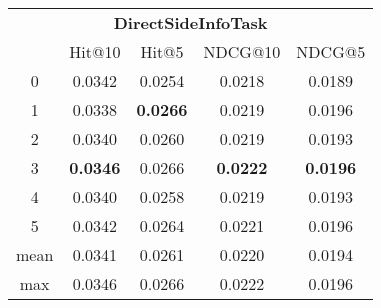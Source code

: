 \documentclass{article}
\begin{document}
 

\begin{tabular}{c|cccc}

\multicolumn{5}{c}{\textbf{DirectSideInfoTask}} \\
\noalign{\smallskip}
\noalign{\smallskip}
\toprule
\multicolumn{1}{c}{Template ID} & \multicolumn{1}{|c}{Hit@10} & \multicolumn{1}{c}{Hit@5} & \multicolumn{1}{c}{NDCG@10} & \multicolumn{1}{c}{NDCG@5} \\
\midrule
0 & 0.0342 & 0.0254 & 0.0218 & 0.0189 \\
1 & 0.0338 & \textbf{0.0266} & 0.0219 & 0.0196 \\
2 & 0.0340 & 0.0260 & 0.0219 & 0.0193 \\
3 & \textbf{0.0346} & 0.0266 & \textbf{0.0222} & \textbf{0.0196} \\
4 & 0.0340 & 0.0258 & 0.0219 & 0.0193 \\
5 & 0.0342 & 0.0264 & 0.0221 & 0.0196 \\
\midrule
mean & 0.0341 & 0.0261 & 0.0220 & 0.0194 \\
max & 0.0346 & 0.0266 & 0.0222 & 0.0196 \\
\bottomrule

\end{tabular}
\end{document}
